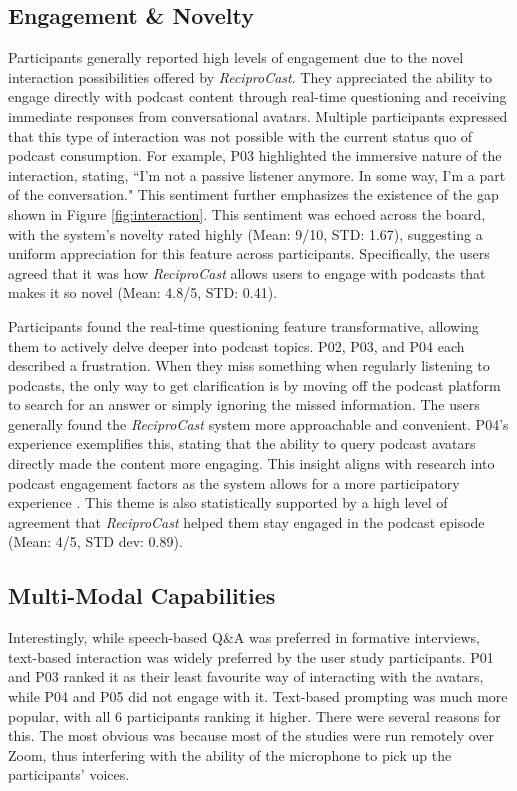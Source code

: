 \documentclass[12pt]{report}
\begin{document}
\begin{myfont}
        \subsection{Engagement \& Novelty}
        Participants generally reported high levels of engagement due to the novel interaction possibilities offered by \textit{ReciproCast}. They appreciated the ability to engage directly with podcast content through real-time questioning and receiving immediate responses from conversational avatars. Multiple participants expressed that this type of interaction was not possible with the current status quo of podcast consumption. For example, P03 highlighted the immersive nature of the interaction, stating, “I’m not a passive listener anymore. In some way, I’m a part of the conversation." This sentiment further emphasizes the existence of the gap shown in Figure \ref{fig:interaction}. This sentiment was echoed across the board, with the system's novelty rated highly (Mean: 9/10, STD: 1.67), suggesting a uniform appreciation for this feature across participants. Specifically, the users agreed that it was how \textit{ReciproCast} allows users to engage with podcasts that makes it so novel (Mean: 4.8/5, STD: 0.41). 

        \indent Participants found the real-time questioning feature transformative, allowing them to actively delve deeper into podcast topics. P02, P03, and P04 each described a frustration. When they miss something when regularly listening to podcasts, the only way to get clarification is by moving off the podcast platform to search for an answer or simply ignoring the missed information. The users generally found the \textit{ReciproCast} system more approachable and convenient. P04's experience exemplifies this, stating that the ability to query podcast avatars directly made the content more engaging. This insight aligns with research into podcast engagement factors as the system allows for a more participatory experience \citep{GarciaMarin2020}. This theme is also statistically supported by a high level of agreement that \textit{ReciproCast} helped them stay engaged in the podcast episode (Mean: 4/5, STD dev: 0.89).

        \subsection{Multi-Modal Capabilities}
        Interestingly, while speech-based Q\&A was preferred in formative interviews, text-based interaction was widely preferred by the user study participants. P01 and P03 ranked it as their least favourite way of interacting with the avatars, while P04 and P05 did not engage with it. Text-based prompting was much more popular, with all 6 participants ranking it higher. There were several reasons for this. The most obvious was because most of the studies were run remotely over Zoom, thus interfering with the ability of the microphone to pick up the participants' voices. 
        

\end{myfont}
\end{document}
